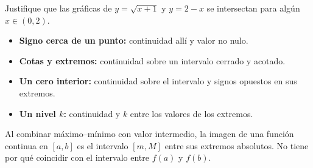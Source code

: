 \documentclass[10pt,a5paper]{article}
\newif\ifmostrarSoluciones
\begin{document}
\begin{ejemplo}
Justifique que las gráficas de $y=\sqrt{x+1}$ y $y=2-x$ se intersectan para algún $x\in(0,2)$.
\end{ejemplo}
\ifmostrarSoluciones
\begin{solucion}
Se define la diferencia $F(x)=\sqrt{x+1}-(2-x)$, continua en $[0,2]$. Como $F(0)=-1<0$ y $F(2)=\sqrt3>0$, Bolzano garantiza un $c\in(0,2)$ con $F(c)=0$. En ese punto, $\sqrt{c+1}=2-c$, que expresa la intersección. El teorema establece existencia sin exigir despejar $c$.
\end{solucion}
\else\vspace{20mm}\fi

\begin{nota}
\begin{itemize}
  \item \textbf{Signo cerca de un punto:} continuidad allí y valor no nulo.
  \item \textbf{Cotas y extremos:} continuidad sobre un intervalo cerrado y acotado.
  \item \textbf{Un cero interior:} continuidad sobre el intervalo y signos opuestos en sus extremos.
  \item \textbf{Un nivel $k$:} continuidad y $k$ entre los valores de los extremos.
\end{itemize}
Al combinar máximo--mínimo con valor intermedio, la imagen de una función continua en $[a,b]$ es el intervalo $[m,M]$ entre sus extremos absolutos. No tiene por qué coincidir con el intervalo entre $f(a)$ y $f(b)$.
\end{nota}
\end{document}
